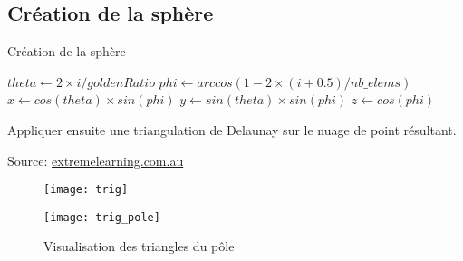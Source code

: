 \documentclass{beamer}
\begin{document}
\subsection{Création de la sphère}
\begin{frame}{Création de la sphère}
\begin{minipage}{0.49\textwidth}
\begin{scriptsize}

\begin{algorithm}[H]
{
        $theta\gets 2\times i  / goldenRatio$\;
        $phi\gets arccos(1-2\times(i+0.5)/nb\_elems)$\;
        $x\gets cos(theta) \times sin(phi)$\;
        $y\gets sin(theta) \times sin(phi)$\;
        $z\gets cos(phi)$\;
}
\end{algorithm}

\end{scriptsize}
\footnotesize Appliquer ensuite une triangulation de Delaunay sur le nuage de point résultant.

\vspace{50px}

\tiny{Source: \href{https://extremelearning.com.au/how-to-evenly-distribute-points-on-a-sphere-more-effectively-than-the-canonical-fibonacci-lattice/}{extremelearning.com.au}}
\end{minipage}
\begin{minipage}{0.45\textwidth}
\begin{figure}
 \centering
 \texttt{[image: trig]}
\end{figure}
\begin{figure}
 \centering
 \texttt{[image: trig\_pole]}
 \caption{Visualisation des triangles du pôle}
\end{figure}

\end{minipage}

\end{frame}
\end{document}
